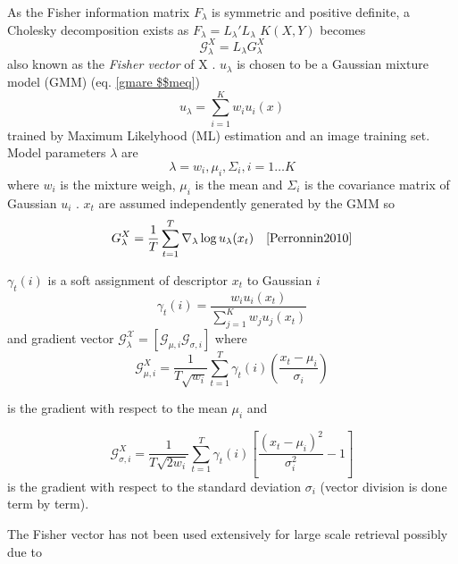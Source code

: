 \documentclass[english,12pt,a4paper,pdftex,elec,utf8]{aaltothesis}
\begin{document}
As the Fisher information matrix $F_\lambda$ is symmetric and positive definite, a Cholesky decomposition exists as $F_\lambda = L_\lambda'L_\lambda$ $K(X,Y)$ becomes
\begin{equation}\label{fishervectorfinal}
\mathcal{G}_\lambda^X = L_\lambda G_\lambda^X
\end{equation}
also known as the \emph{Fisher vector} of X \cite{Perronnin2010}. $u_\lambda$ is chosen to be a Gaussian mixture model (GMM) (eq. \ref{gmare $$meq})
\begin{equation}\label{gmmeq}
u_\lambda = \sum_{i=1}^K w_iu_i(x)
\end{equation}
trained by Maximum Likelyhood (ML) estimation and an image training set. Model parameters $\lambda$ are
\begin{equation}\label{lambdaparams}
\lambda = {w_i,\mu_i, \Sigma_i, i=1 \ldots K}
\end{equation}
where $w_i$ is the mixture weigh, $\mu_i$ is the mean and $\Sigma_i$ is the covariance matrix of Gaussian $u_i$ \cite{Perronnin2010}. $x_t$ are assumed independently generated by the GMM so
\begin{equation}\label{gmm}
G_\lambda^X = \frac{1}{T}\sum_{t=1}^T \nabla_\lambda \log u_\lambda(x_t) \quad \cite{Perronnin2010}
\end{equation}

$\gamma_t(i)$ is a soft assignment of descriptor $x_t$ to Gaussian $i$
\begin{equation} \label{descriptortogaussian}
\gamma_t(i) = \frac{w_iu_i(x_t)}{\sum_{j=1}^Kw_ju_j(x_t)}
\end{equation}
and gradient vector $\mathcal{G_\lambda^X} = [\mathcal{G}_{\mu,i} \mathcal{G}_{\sigma,i}] $ where
\begin{equation}\label{fishervectormu}
\mathcal{G}_{\mu,i}^X = \frac{1}{T\sqrt{w_i}} \sum^T_{t=1} \gamma_t(i)\left(\frac{x_t - \mu_i}{\sigma_i}\right)
\end{equation}

is the gradient with respect to the mean $\mu_i$ and

\begin{equation}\label{fishervectorsigma}
\mathcal{G}_{\sigma,i}^X = \frac{1}{T\sqrt{2w_i}} \sum_{t=1}^T \gamma_t(i)\left[\frac{(x_t - \mu_i)^2}{\sigma_i^2} -1\right]
  \end{equation}
is the gradient with respect to the standard deviation $\sigma_i$ (vector division is done term by term). \cite{Perronnin2010}

The Fisher vector has not been used extensively for large scale retrieval possibly due to
\end{document}
